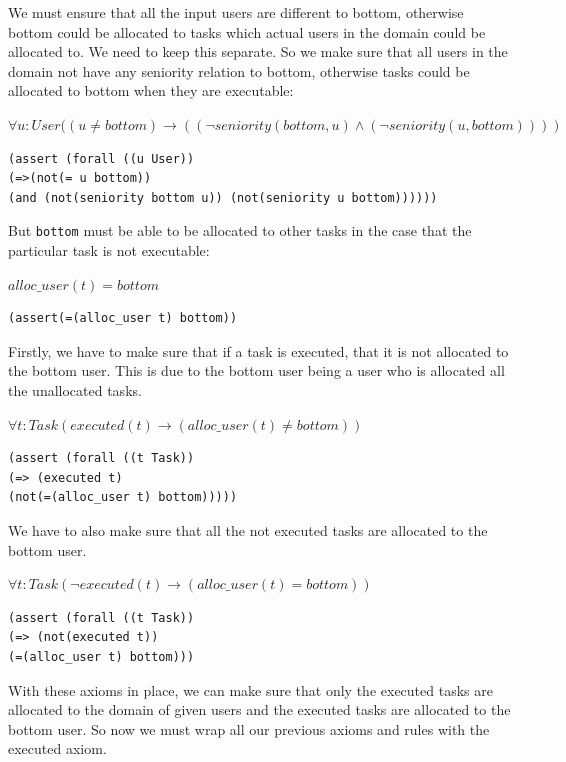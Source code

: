 \documentclass[a4paper]{report}
\begin{document}
We must ensure that all the input users are different to bottom, otherwise bottom could be allocated to tasks which actual users in the domain could be allocated to. We need to keep this separate. So we make sure that all users in the domain not have any seniority relation to bottom, otherwise tasks could be allocated to bottom when they are executable:
\begin{center}
$\forall u : User ((u \neq bottom) \longrightarrow ((\neg seniority(bottom, u) \wedge (\neg seniority(u, bottom))))$
\end{center}
\begin{lstlisting}[frame=single]
(assert (forall ((u User))
(=>(not(= u bottom))
(and (not(seniority bottom u)) (not(seniority u bottom))))))
\end{lstlisting}

But \texttt{bottom} must be able to be allocated to other tasks in the case that the particular task is not executable:
\begin{center}
$alloc\_user(t) = bottom$
\end{center}
\begin{lstlisting}[frame=single]
(assert(=(alloc_user t) bottom))
\end{lstlisting}

Firstly, we have to make sure that if a task is executed, that it is not allocated to the bottom user. This is due to the bottom user being a user who is allocated all the unallocated tasks.
\begin{center}
$\forall t : Task (executed(t) \longrightarrow ( alloc\_user(t) \neq bottom))$
\end{center}
\begin{lstlisting}[frame=single]
(assert (forall ((t Task))
(=> (executed t)
(not(=(alloc_user t) bottom)))))
\end{lstlisting}

We have to also make sure that all the not executed tasks are allocated to the bottom user. 
\begin{center}
$\forall t : Task (\neg executed(t) \longrightarrow (alloc\_user(t) = bottom))$
\end{center}
\begin{lstlisting}[frame=single]
(assert (forall ((t Task))
(=> (not(executed t))
(=(alloc_user t) bottom)))
\end{lstlisting}

With these axioms in place, we can make sure that only the executed tasks are allocated to the domain of given users and the executed tasks are allocated to the bottom user. So now we must  wrap all our previous axioms and rules with the executed axiom.\\
\end{document}
